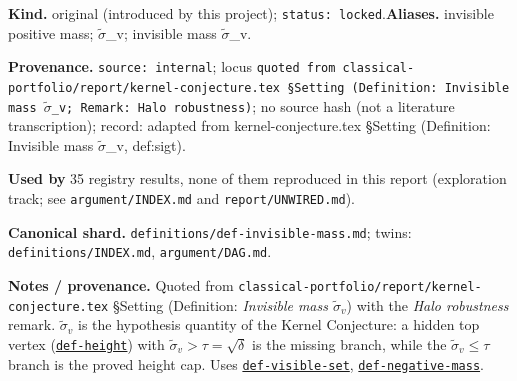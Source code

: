 \begin{defnote}
\textbf{Kind.} original (introduced by this project); \texttt{status: locked}.\quad\textbf{Aliases.} invisible positive mass; $\widetilde\sigma$\_v; invisible mass $\widetilde\sigma$\_v.
\par
\textbf{Provenance.} \texttt{source: internal}; locus \texttt{quoted from classical-\allowbreak{}portfolio/\allowbreak{}report/\allowbreak{}kernel-\allowbreak{}conjecture.\allowbreak{}tex \S{}Setting (Definition:\allowbreak{} Invisible mass \textnormal{$\widetilde\sigma$}\_v;\allowbreak{} Remark:\allowbreak{} Halo robustness)}; no source hash (not a literature transcription); record: adapted from kernel-\allowbreak{}conjecture.\allowbreak{}tex \S{}Setting (Definition:\allowbreak{} Invisible mass \textnormal{$\widetilde\sigma$}\_v,\allowbreak{} def:\allowbreak{}sigt).
\par
\textbf{Used by} 35 registry results, none of them reproduced in this report (exploration track; see \texttt{argument/INDEX.md} and \texttt{report/UNWIRED.md}).
\par
\textbf{Canonical shard.} \texttt{definitions/\allowbreak{}def-\allowbreak{}invisible-\allowbreak{}mass.\allowbreak{}md}; twins: \texttt{definitions/INDEX.md}, \texttt{argument/DAG.md}.
\par
\textbf{Notes / provenance.} Quoted from \texttt{classical-\allowbreak{}portfolio/\allowbreak{}report/\allowbreak{}kernel-\allowbreak{}conjecture.\allowbreak{}tex} \S{}Setting
(Definition: \emph{Invisible mass $\widetilde\sigma_v$}) with the \emph{Halo robustness} remark. $\widetilde\sigma_v$
is the hypothesis quantity of the Kernel Conjecture: a hidden top vertex (\hyperref[def:height]{\texttt{def-\allowbreak{}height}}) with
$\widetilde\sigma_v>\tau=\sqrt\delta$ is the missing branch, while the $\widetilde\sigma_v\le\tau$ branch is
the proved height cap. Uses \hyperref[def:visible-set]{\texttt{def-\allowbreak{}visible-\allowbreak{}set}}, \hyperref[def:negative-mass]{\texttt{def-\allowbreak{}negative-\allowbreak{}mass}}.
\end{defnote}

